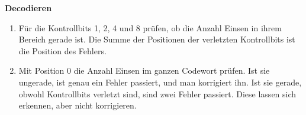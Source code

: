 \begin{myprocedure}
    \textbf{Decodieren}
    \begin{enumerate}
        \item Für die Kontrollbits 1, 2, 4 und 8 prüfen, ob die Anzahl
              Einsen in ihrem Bereich gerade ist. Die Summe der
              Positionen der verletzten Kontrollbits ist die Position
              des Fehlers.
        \item Mit Position 0 die Anzahl Einsen im ganzen Codewort
              prüfen. Ist sie ungerade, ist genau ein Fehler passiert,
              und man korrigiert ihn. Ist sie gerade, obwohl Kontrollbits
              verletzt sind, sind zwei Fehler passiert. Diese lassen
              sich erkennen, aber nicht korrigieren.
    \end{enumerate}
\end{myprocedure}

